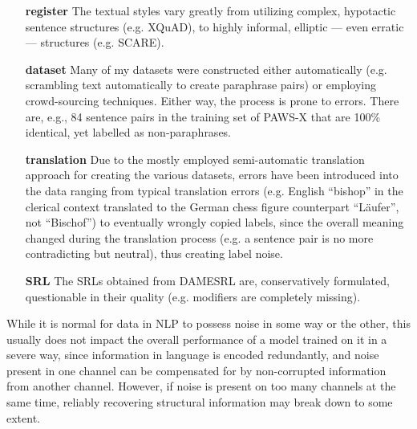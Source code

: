 \begin{itemize}
  \item[\textbf{register}] The textual styles vary greatly from utilizing complex,
                           hypotactic sentence structures (e.g. XQuAD), to highly
                           informal, elliptic --- even erratic --- structures
                           (e.g. SCARE).
 \item[\textbf{dataset}] Many of my datasets were constructed either automatically
                         (e.g. scrambling text automatically to create paraphrase pairs)
                         or employing crowd-sourcing techniques. Either way, the process
                         is prone to errors. There are, e.g., 84 sentence pairs in the training
                         set of PAWS-X that are 100\% identical, yet labelled as non-paraphrases.
 \item[\textbf{translation}] Due to the mostly employed semi-automatic translation
                             approach for creating the various datasets, errors
                             have been introduced into the data ranging from typical
                             translation errors (e.g. English ``bishop'' in the clerical
                             context translated to the German chess figure counterpart
                             ``Läufer'', not ``Bischof'') to eventually wrongly copied
                             labels, since the overall meaning changed during
                             the translation process (e.g. a sentence pair is no more
                             contradicting but neutral), thus creating label noise.
 \item[\textbf{SRL}] The SRLs obtained from DAMESRL are, conservatively formulated,
                     questionable in their quality (e.g. modifiers are completely missing).
\end{itemize}

While it is normal for data in NLP to possess noise in some way or the other, this usually does
not impact the overall performance of a model trained on it in a severe way, since information
in language is encoded redundantly, and noise present in one channel can be compensated for by
non-corrupted information from another channel. However, if noise
is present on too many channels at the same time, reliably recovering structural information may
break down to some extent.



